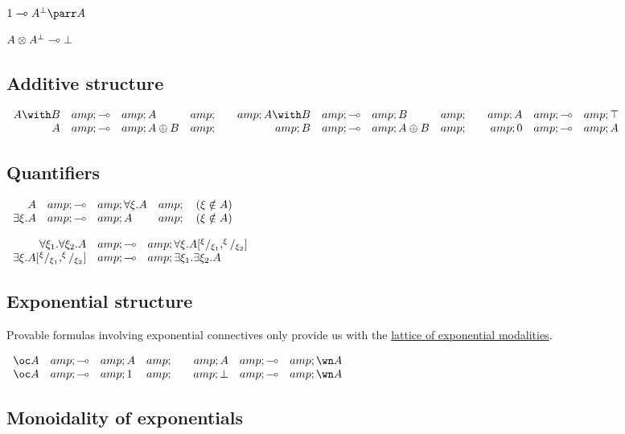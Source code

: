 \(\one \limp A\orth\parr A\)

\(A\otimes A^\bot \multimap\bot\)

\subsection{Additive structure}\label{additive-structure}

\(\begin{array}{rclcrclcrcl}
  A\with B &amp;\limp&amp; A &amp;\quad&amp; A\with B &amp;\limp&amp; B &amp;\quad&amp; A &amp;\limp&amp; \top\\
  A &amp;\limp&amp; A\plus B &amp;\quad&amp; B &amp;\limp&amp; A\plus B &amp;\quad&amp; \zero &amp;\limp&amp; A
\end{array}\)

\subsection{Quantifiers}\label{quantifiers-2}

\(\begin{array}{rcll}
  A &amp;\multimap&amp; \forall \xi.A  &amp;\quad  (\xi\notin A) \\
  \exists \xi.A &amp;\multimap&amp; A  &amp;\quad  (\xi\notin A)
\end{array}\)

\(\begin{array}{rcl}
  \forall \xi_1.\forall \xi_2. A &amp;\multimap&amp; \forall \xi. A[^\xi/_{\xi_1},^\xi/_{\xi_2}] \\
  \exists \xi.A[^\xi/_{\xi_1},^\xi/_{\xi_2}] &amp;\multimap&amp; \exists \xi_1. \exists \xi_2.A
\end{array}\)

\subsection{Exponential structure}\label{exponential-structure}

Provable formulas involving exponential connectives only provide us with
the \href{lattice_of_exponential_modalities}{lattice of exponential
modalities}.

\(\begin{array}{rclcrcl}
  \oc A &amp;\limp&amp; A &amp;\quad&amp; A&amp;\limp&amp;\wn A\\
  \oc A &amp;\limp&amp; 1 &amp;\quad&amp; \bot &amp;\limp&amp; \wn A
\end{array}\)

\subsection{Monoidality of
exponentials}\label{monoidality-of-exponentials}

